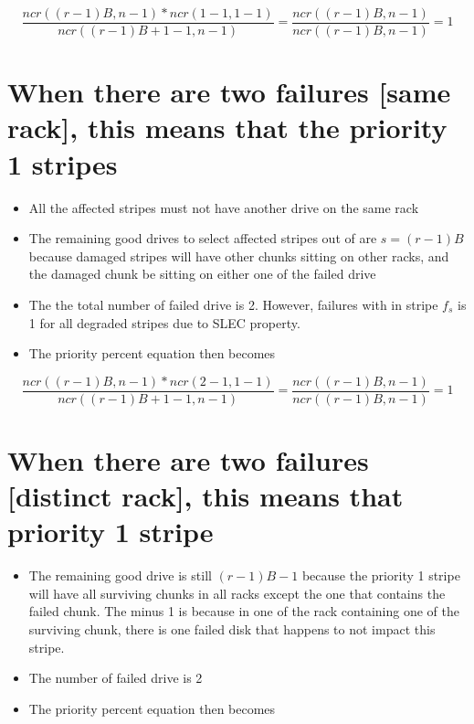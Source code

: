 \documentclass[journal]{IEEEtran}
\begin{document}
\begin{equation*}
  \frac{ncr((r-1)B, n-1)*ncr(1-1, 1-1)}{ncr((r-1)B+1-1, n-1)}=\frac{ncr((r-1)B, n-1)}{ncr((r-1)B, n-1)}=1
\end{equation*}




\section{When there are two failures [same rack], this means that the \textbf{priority 1 stripes} }
\begin{itemize}
  \item All the affected stripes must not have another drive on the same rack
  \item The remaining good drives to select affected stripes out of are $s=(r-1)B$ because damaged stripes will have other chunks sitting on other racks, and the damaged chunk be sitting on either one of the failed drive
  \item The the total number of failed drive is 2. However, failures with in stripe $f_s$ is 1 for all degraded stripes due to SLEC property.
  \item The priority percent equation then becomes
\end{itemize}

\begin{equation*}
  \frac{ncr((r-1)B, n-1)*ncr(2-1, 1-1)}{ncr((r-1)B+1-1, n-1)}=\frac{ncr((r-1)B, n-1)}{ncr((r-1)B, n-1)}=1
\end{equation*}

\section{When there are two failures [distinct rack], this means that \textbf{priority 1 stripe}}
\begin{itemize}
  \item The remaining good drive is still $(r-1)B-1$ because the priority 1 stripe will have all surviving chunks in all racks except the one that contains the failed chunk. The minus 1 is because in one of the rack containing one of the surviving chunk, there is one failed disk that happens to not impact this stripe.
  \item The number of failed drive is 2
  \item The priority percent equation then becomes
\end{itemize}
\end{document}
